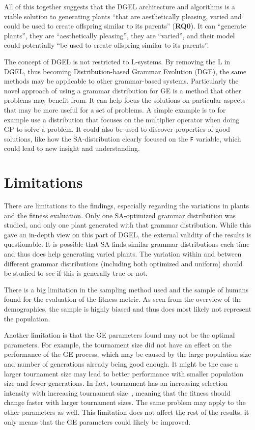All of this together suggests that the \gls{DGEL} architecture and algorithms is a viable solution to generating plants ``that are aesthetically pleasing, varied and could be used to create offspring similar to its parents'' (\textbf{RQ0}).
It can ``generate plants'', they are ``aesthetically pleasing'', they are ``varied'', and their model could potentially ``be used to create offspring similar to its parents''.

The concept of \gls{DGEL} is not restricted to \glspl{L-system}.
By removing the L in \gls{DGEL}, thus becoming Distribution-based Grammar Evolution (DGE), the same methods may be applicable to other grammar-based systems.
Particularly the novel approach of using a grammar distribution for \gls{GE} is a method that other problems may benefit from.
It can help focus the solutions on particular aspects that may be more useful for a set of problems.
A simple example is to for example use a distribution that focuses on the multiplier operator when doing \gls{GP} to solve a problem.
It could also be used to discover properties of good solutions, like how the \gls{SA}-distribution clearly focused on the \texttt{F} variable, which could lead to new insight and understanding.

\section{Limitations}
There are limitations to the findings, especially regarding the variations in plants and the fitness evaluation.
Only one \gls{SA}-optimized grammar distribution was studied, and only one plant generated with that grammar distribution.
While this gave an in-depth view on this part of \gls{DGEL}, the external validity of the results is questionable.
It is possible that \gls{SA} finds similar grammar distributions each time and thus does help generating varied plants.
The variation within and between different grammar distributions (including both optimized and uniform) should be studied to see if this is generally true or not.

There is a big limitation in the sampling method used and the sample of humans found for the evaluation of the fitness metric.
As seen from the overview of the demographics, the sample is highly biased and thus does most likely not represent the population.

Another limitation is that the \gls{GE} parameters found may not be the optimal parameters.
For example, the tournament size did not have an effect on the performance of the \gls{GE} process, which may be caused by the large population size and number of generations already being good enough.
It might be the case a larger tournament size may lead to better performance with smaller population size and fewer generations.
In fact, tournament has an increasing selection intensity with increasing tournament size~\cite{1995Blickle}, meaning that the fitness should change faster with larger tournament sizes.
The same problem may apply to the other parameters as well.
This limitation does not affect the rest of the results, it only means that the \gls{GE} parameters could likely be improved.

